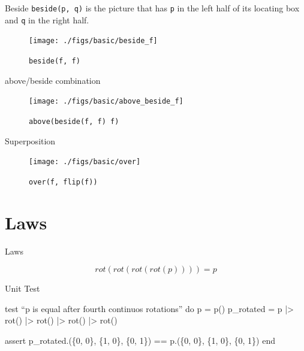 \documentclass{beamer}
\begin{document}
    \begin{frame}{Beside}
        \texttt{beside(p, q)} is the picture that has \texttt{p} in the left half
        of its locating box and \texttt{q} in the right half.

        \begin{figure}
            \centering
            \texttt{[image: ./figs/basic/beside\_f]}
            \caption{\texttt{beside(f, f)}\label{fig:beside}}
        \end{figure}
    \end{frame}

    \begin{frame}{above/beside combination}
        \begin{figure}
            \centering
            \texttt{[image: ./figs/basic/above\_beside\_f]}
            \caption{\texttt{above(beside(f, f) f)}\label{fig:above_beside_f}}
        \end{figure}
    \end{frame}

    \begin{frame}{Superposition}
        \begin{figure}
            \centering
            \texttt{[image: ./figs/basic/over]}
            \caption{\texttt{over(f, flip(f))}\label{fig:over_f}}
        \end{figure}
    \end{frame}

    \section{Laws}

\begin{frame}[fragile]{Laws}

\begin{equation*}
  rot(rot(rot(rot(p)))) = p
\end{equation*}

\begin{exampleblock}{Unit Test}
\begin{semiverbatim}
\tiny
\alert{test} {\color{gray}``p is equal after fourth continuos rotations''} \alert{do}
 p {\color{magenta}=} p()
 p\_rotated {\color{magenta}=} p |> rot() |> rot() |> rot() |> rot()

 assert p\_rotated{\color{magenta}.}(\{0, 0\}, \{1, 0\}, \{0, 1\}) {\color{magenta}==} p{\color{magenta}.}(\{0, 0\}, \{1, 0\}, \{0, 1\})
\alert{end}
\end{semiverbatim}
\end{exampleblock}

\end{frame}
\end{document}

